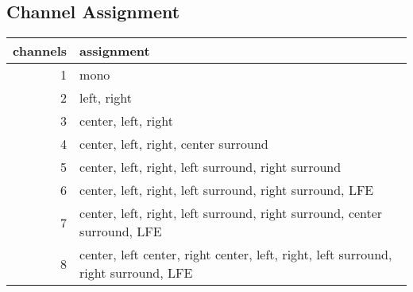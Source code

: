\subsection{Channel Assignment}
\begin{table}[h]
\begin{tabular}{r|l}
channels & assignment \\
\hline
1 & mono \\
2 & left, right \\
3 & center, left, right \\
4 & center, left, right, center surround \\
5 & center, left, right, left surround, right surround \\
6 & center, left, right, left surround, right surround, LFE \\
7 & center, left, right, left surround, right surround, center surround, LFE \\
8 & center, left center, right center, left, right, left surround, right surround, LFE \\
\end{tabular}
\end{table}
